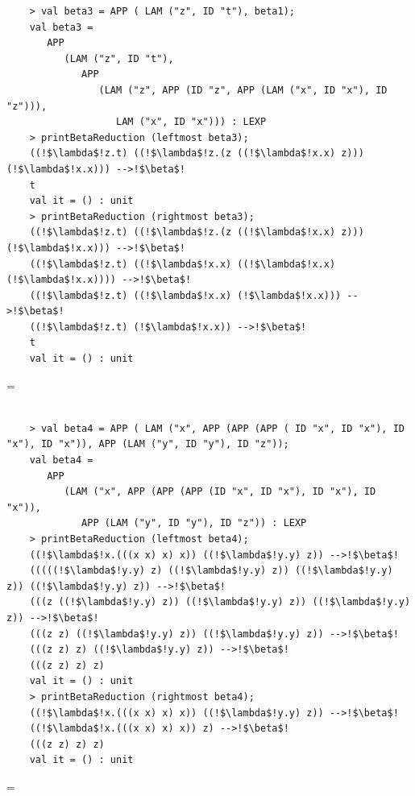 \documentclass[11pt]{article}
\newenvironment{neverbreak} %
{\par\nobreak\vfil\penalty0\vfilneg
	\vtop\bgroup}
{\par\xdef\tpd{\the\prevdepth}\egroup
	\prevdepth=\tpd}
\begin{document}
\begin{enumerate}
\begin{neverbreak}
\begin{verbatim}
	> val beta3 = APP ( LAM ("z", ID "t"), beta1);
	val beta3 =
	   APP
	      (LAM ("z", ID "t"),
	         APP
	            (LAM ("z", APP (ID "z", APP (LAM ("x", ID "x"), ID "z"))),
	               LAM ("x", ID "x"))) : LEXP
	> printBetaReduction (leftmost beta3);
	((!$\lambda$!z.t) ((!$\lambda$!z.(z ((!$\lambda$!x.x) z))) (!$\lambda$!x.x))) -->!$\beta$!
	t
	val it = () : unit
	> printBetaReduction (rightmost beta3);
	((!$\lambda$!z.t) ((!$\lambda$!z.(z ((!$\lambda$!x.x) z))) (!$\lambda$!x.x))) -->!$\beta$!
	((!$\lambda$!z.t) ((!$\lambda$!x.x) ((!$\lambda$!x.x) (!$\lambda$!x.x)))) -->!$\beta$!
	((!$\lambda$!z.t) ((!$\lambda$!x.x) (!$\lambda$!x.x))) -->!$\beta$!
	((!$\lambda$!z.t) (!$\lambda$!x.x)) -->!$\beta$!
	t
	val it = () : unit
\end{verbatim}
\end{neverbreak}
	
\begin{neverbreak}
\begin{verbatim}	
	
	> val beta4 = APP ( LAM ("x", APP (APP (APP ( ID "x", ID "x"), ID "x"), ID "x")), APP (LAM ("y", ID "y"), ID "z"));
	val beta4 =
	   APP
	      (LAM ("x", APP (APP (APP (ID "x", ID "x"), ID "x"), ID "x")),
	         APP (LAM ("y", ID "y"), ID "z")) : LEXP
	> printBetaReduction (leftmost beta4);
	((!$\lambda$!x.(((x x) x) x)) ((!$\lambda$!y.y) z)) -->!$\beta$!
	(((((!$\lambda$!y.y) z) ((!$\lambda$!y.y) z)) ((!$\lambda$!y.y) z)) ((!$\lambda$!y.y) z)) -->!$\beta$!
	(((z ((!$\lambda$!y.y) z)) ((!$\lambda$!y.y) z)) ((!$\lambda$!y.y) z)) -->!$\beta$!
	(((z z) ((!$\lambda$!y.y) z)) ((!$\lambda$!y.y) z)) -->!$\beta$!
	(((z z) z) ((!$\lambda$!y.y) z)) -->!$\beta$!
	(((z z) z) z)
	val it = () : unit
	> printBetaReduction (rightmost beta4);
	((!$\lambda$!x.(((x x) x) x)) ((!$\lambda$!y.y) z)) -->!$\beta$!
	((!$\lambda$!x.(((x x) x) x)) z) -->!$\beta$!
	(((z z) z) z)
	val it = () : unit
\end{verbatim}
\end{neverbreak}
	

\end{enumerate}
\end{document}
